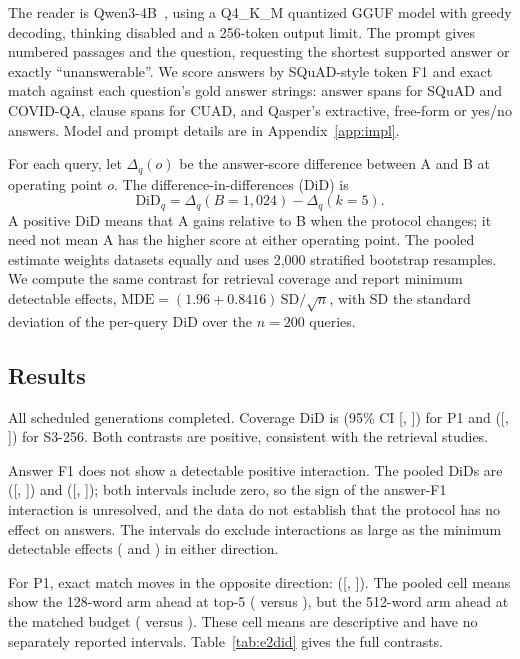 \documentclass[11pt]{article}
\begin{document}
The reader is Qwen3-4B~\cite{qwen2025qwen3}, using a Q4\_K\_M quantized GGUF model with greedy decoding, thinking disabled and a 256-token output limit. The prompt gives numbered passages and the question, requesting the shortest supported answer or exactly ``unanswerable''. We score answers by SQuAD-style token F1 and exact match against each question's gold answer strings: answer spans for SQuAD and COVID-QA, clause spans for CUAD, and Qasper's extractive, free-form or yes/no answers. Model and prompt details are in Appendix~\ref{app:impl}.

For each query, let $\Delta_q(o)$ be the answer-score difference between A and B at operating point $o$. The difference-in-differences (DiD) is
\begin{equation}
\mathrm{DiD}_q=\Delta_q(B=1{,}024)-\Delta_q(k=5).
\label{eq:did}
\end{equation}
A positive DiD means that A gains relative to B when the protocol changes; it need not mean A has the higher score at either operating point. The pooled estimate weights datasets equally and uses 2,000 stratified bootstrap resamples. We compute the same contrast for retrieval coverage and report minimum detectable effects, $\mathrm{MDE}=(1.96+0.8416)\,\mathrm{SD}/\sqrt{n}$, with SD the standard deviation of the per-query DiD over the $n=200$ queries.

\subsection{Results}
All scheduled generations completed. Coverage DiD is \EtwoPoneCov{} (95\% CI [\EtwoPoneCovLo, \EtwoPoneCovHi]) for P1 and \EtwoSthreeCov{} ([\EtwoSthreeCovLo, \EtwoSthreeCovHi]) for S3-256. Both contrasts are positive, consistent with the retrieval studies.

Answer F1 does not show a detectable positive interaction. The pooled DiDs are \EtwoPoneFone{} ([\EtwoPoneFoneLo, \EtwoPoneFoneHi]) and \EtwoSthreeFone{} ([\EtwoSthreeFoneLo, \EtwoSthreeFoneHi]); both intervals include zero, so the sign of the answer-F1 interaction is unresolved, and the data do not establish that the protocol has no effect on answers. The intervals do exclude interactions as large as the minimum detectable effects (\EtwoPoneFoneMde{} and \EtwoSthreeFoneMde{}) in either direction.

For P1, exact match moves in the opposite direction: \EtwoPoneEm{} ([\EtwoPoneEmLo, \EtwoPoneEmHi]). The pooled cell means show the 128-word arm ahead at top-5 (\EtwoEmOneTwoEightCount{} versus \EtwoEmFiveTwelveCount), but the 512-word arm ahead at the matched budget (\EtwoEmFiveTwelveBudget{} versus \EtwoEmOneTwoEightBudget). These cell means are descriptive and have no separately reported intervals. Table~\ref{tab:e2did} gives the full contrasts.

\end{document}
